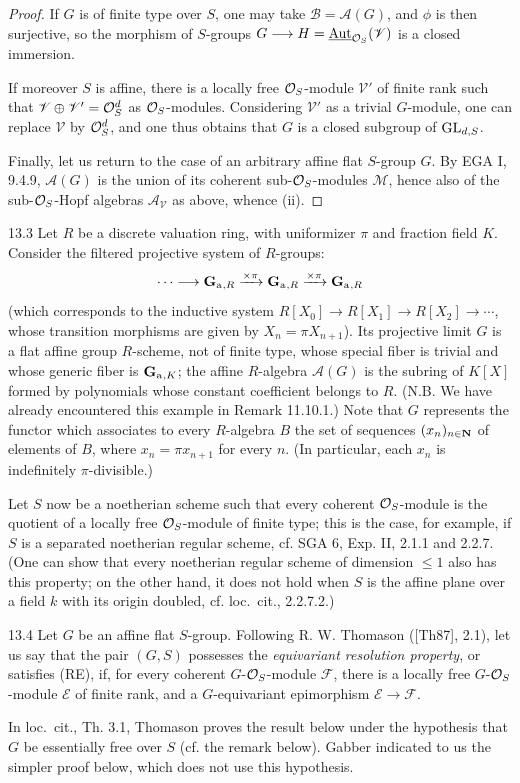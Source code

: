 \begin{proof}
If $G$ is of finite type over $S$, one may take $\mathscr B=\mathscr A(G)$, and $\phi$ is then surjective, so the morphism of $S$-groups $G\longrightarrow H=\underline{\operatorname{Aut}}_{\mathcal{O}_S}(\mathscr V)$ is a closed immersion.

If moreover $S$ is affine, there is a locally free $\mathcal{O}_S$-module $\mathscr V'$ of finite rank such that $\mathscr V\oplus\mathscr V'=\mathcal{O}_S^d$ as $\mathcal{O}_S$-modules. Considering $\mathscr V'$ as a trivial $G$-module, one can replace $\mathscr V$ by $\mathcal{O}_S^d$, and one thus obtains that $G$ is a closed subgroup of $\operatorname{GL}_{d,S}$.

Finally, let us return to the case of an arbitrary affine flat $S$-group $G$. By EGA I, 9.4.9, $\mathscr A(G)$ is the union of its coherent sub-$\mathcal{O}_S$-modules $\mathscr M$, hence also of the sub-$\mathcal{O}_S$-Hopf algebras $\mathscr A_{\mathscr V}$ as above, whence (ii).
\end{proof}

\begin{example}{13.3}\label{VIB.13.3}
Let $R$ be a discrete valuation ring, with uniformizer $\pi$ and fraction field $K$. Consider the filtered projective system of $R$-groups:
\[
\cdots\longrightarrow\mathbf{G}_{\mathrm{a}}{}_{,R}\xrightarrow{\times\pi}\mathbf{G}_{\mathrm{a}}{}_{,R}\xrightarrow{\times\pi}\mathbf{G}_{\mathrm{a}}{}_{,R}
\]
(which corresponds to the inductive system $R[X_0]\to R[X_1]\to R[X_2]\to\cdots$, whose transition morphisms are given by $X_n=\pi X_{n+1}$). Its projective limit $G$ is a flat affine group $R$-scheme, not of finite type, whose special fiber is trivial and whose generic fiber is $\mathbf{G}_{\mathrm{a}}{}_{,K}$; the affine $R$-algebra $\mathscr A(G)$ is the subring of $K[X]$ formed by polynomials whose constant coefficient belongs to $R$. (N.B. We have already encountered this example in Remark 11.10.1.) Note that $G$ represents the functor which associates to every $R$-algebra $B$ the set of sequences $(x_n)_{n\in\mathbf{N}}$ of elements of $B$, where $x_n=\pi x_{n+1}$ for every $n$. (In particular, each $x_n$ is indefinitely $\pi$-divisible.)
\end{example}
Let $S$ now be a noetherian scheme such that every coherent $\mathcal{O}_S$-module is the quotient of a locally free $\mathcal{O}_S$-module of finite type; this is the case, for example, if $S$ is a separated noetherian regular scheme, cf. SGA 6, Exp. II, 2.1.1 and 2.2.7. (One can show that every noetherian regular scheme of dimension $\leq1$ also has this property; on the other hand, it does not hold when $S$ is the affine plane over a field $k$ with its origin doubled, cf. loc.\ cit., 2.2.7.2.)

\begin{definition}{13.4}\label{VIB.13.4}
Let $G$ be an affine flat $S$-group. Following R. W. Thomason ([Th87], 2.1), let us say that the pair $(G,S)$ possesses the \emph{equivariant resolution property}, or satisfies (RE), if, for every coherent $G$-$\mathcal{O}_S$-module $\mathscr F$, there is a locally free $G$-$\mathcal{O}_S$-module $\mathscr E$ of finite rank, and a $G$-equivariant epimorphism $\mathscr E\to\mathscr F$.
\end{definition}
In loc.\ cit., Th. 3.1, Thomason proves the result below under the hypothesis that $G$ be essentially free over $S$ (cf. the remark below). Gabber indicated to us the simpler proof below, which does not use this hypothesis.

